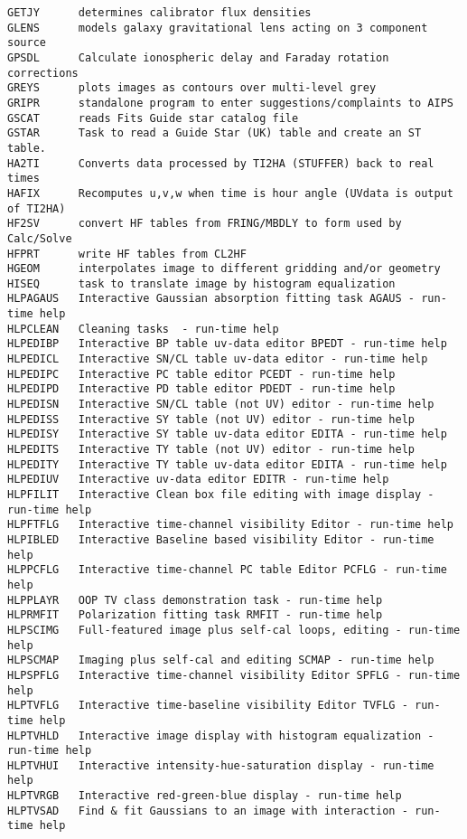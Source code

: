 \begin{verbatim}
GETJY      determines calibrator flux densities
GLENS      models galaxy gravitational lens acting on 3 component source
GPSDL      Calculate ionospheric delay and Faraday rotation corrections
GREYS      plots images as contours over multi-level grey
GRIPR      standalone program to enter suggestions/complaints to AIPS
GSCAT      reads Fits Guide star catalog file
GSTAR      Task to read a Guide Star (UK) table and create an ST table.
HA2TI      Converts data processed by TI2HA (STUFFER) back to real times
HAFIX      Recomputes u,v,w when time is hour angle (UVdata is output of TI2HA)
HF2SV      convert HF tables from FRING/MBDLY to form used by Calc/Solve
HFPRT      write HF tables from CL2HF
HGEOM      interpolates image to different gridding and/or geometry
HISEQ      task to translate image by histogram equalization
HLPAGAUS   Interactive Gaussian absorption fitting task AGAUS - run-time help
HLPCLEAN   Cleaning tasks  - run-time help
HLPEDIBP   Interactive BP table uv-data editor BPEDT - run-time help
HLPEDICL   Interactive SN/CL table uv-data editor - run-time help
HLPEDIPC   Interactive PC table editor PCEDT - run-time help
HLPEDIPD   Interactive PD table editor PDEDT - run-time help
HLPEDISN   Interactive SN/CL table (not UV) editor - run-time help
HLPEDISS   Interactive SY table (not UV) editor - run-time help
HLPEDISY   Interactive SY table uv-data editor EDITA - run-time help
HLPEDITS   Interactive TY table (not UV) editor - run-time help
HLPEDITY   Interactive TY table uv-data editor EDITA - run-time help
HLPEDIUV   Interactive uv-data editor EDITR - run-time help
HLPFILIT   Interactive Clean box file editing with image display - run-time help
HLPFTFLG   Interactive time-channel visibility Editor - run-time help
HLPIBLED   Interactive Baseline based visibility Editor - run-time help
HLPPCFLG   Interactive time-channel PC table Editor PCFLG - run-time help
HLPPLAYR   OOP TV class demonstration task - run-time help
HLPRMFIT   Polarization fitting task RMFIT - run-time help
HLPSCIMG   Full-featured image plus self-cal loops, editing - run-time help
HLPSCMAP   Imaging plus self-cal and editing SCMAP - run-time help
HLPSPFLG   Interactive time-channel visibility Editor SPFLG - run-time help
HLPTVFLG   Interactive time-baseline visibility Editor TVFLG - run-time help
HLPTVHLD   Interactive image display with histogram equalization - run-time help
HLPTVHUI   Interactive intensity-hue-saturation display - run-time help
HLPTVRGB   Interactive red-green-blue display - run-time help
HLPTVSAD   Find & fit Gaussians to an image with interaction - run-time help

\end{verbatim}
